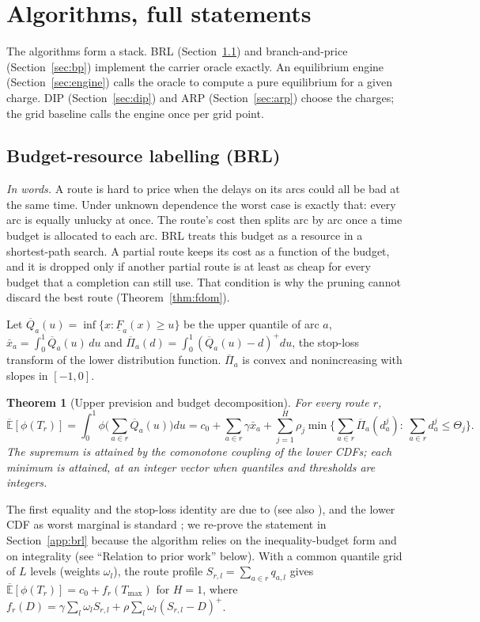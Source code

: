 \documentclass[preprint,11pt]{elsarticle}
\newtheorem{theorem}{Theorem}
\theoremstyle{definition}
\theoremstyle{remark}
\newcommand{\Eu}{\overline{\mathbb{E}}}
\newcommand{\Qb}{\overline{Q}}
\newcommand{\Fl}{\underline{F}}
\newcommand{\Pib}{\overline{\Pi}}
\newcommand{\xb}{\bar x}
\newcommand{\pos}[1]{\left(#1\right)^{+}}
\begin{document}
\section{Algorithms, full statements}\label{sec:algo}

The algorithms form a stack. BRL (Section~\ref{sec:brl}) and branch-and-price (Section~\ref{sec:bp}) implement the carrier oracle exactly. An equilibrium engine (Section~\ref{sec:engine}) calls the oracle to compute a pure equilibrium for a given charge. DIP (Section~\ref{sec:dip}) and ARP (Section~\ref{sec:arp}) choose the charges; the grid baseline calls the engine once per grid point.

\subsection{Budget-resource labelling (BRL)}\label{sec:brl}

\emph{In words.} A route is hard to price when the delays on its arcs could all be bad at the same time. Under unknown dependence the worst case is exactly that: every arc is equally unlucky at once. The route's cost then splits arc by arc once a time budget is allocated to each arc. BRL treats this budget as a resource in a shortest-path search. A partial route keeps its cost as a function of the budget, and it is dropped only if another partial route is at least as cheap for every budget that a completion can still use. That condition is why the pruning cannot discard the best route (Theorem~\ref{thm:fdom}).

Let $\Qb_a(u)=\inf\{x:\Fl_a(x)\ge u\}$ be the upper quantile of arc $a$, $\xb_a=\int_0^1\Qb_a(u)\,du$ and $\Pib_a(d)=\int_0^1\pos{\Qb_a(u)-d}du$, the stop-loss transform of the lower distribution function. $\Pib_a$ is convex and nonincreasing with slopes in $[-1,0]$.

\begin{theorem}[Upper prevision and budget decomposition]\label{thm:brl-main}
For every route $r$,
\[
\Eu[\phi(T_r)]=\int_0^1\phi\Big(\sum_{a\in r}\Qb_a(u)\Big)du
=c_0+\sum_{a\in r}\gamma\xb_a+\sum_{j=1}^{H}\rho_j\min\Big\{\sum_{a\in r}\Pib_a(d^j_a):\ \sum_{a\in r}d^j_a\le\Theta_j\Big\}.
\]
The supremum is attained by the comonotone coupling of the lower CDFs; each minimum is attained, at an integer vector when quantiles and thresholds are integers.
\end{theorem}

The first equality and the stop-loss identity are due to \citet{Meilijson1979} (see also \citealp{Kaas2000,Dhaene2002}), and the lower CDF as worst marginal is standard \citep{Williamson1990}; we re-prove the statement in Section~\ref{app:brl} because the algorithm relies on the inequality-budget form and on integrality (see ``Relation to prior work'' below). With a common quantile grid of $L$ levels (weights $\omega_l$), the route profile $S_{r,l}=\sum_{a\in r}q_{a,l}$ gives $\Eu[\phi(T_r)]=c_0+f_r(T_{\max})$ for $H=1$, where $f_r(D)=\gamma\sum_l\omega_lS_{r,l}+\rho\sum_l\omega_l\pos{S_{r,l}-D}$.
\end{document}
